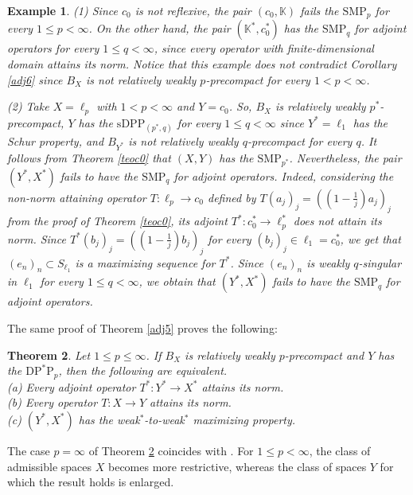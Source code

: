\documentclass[12 pt]{article}%
\newtheorem{theorem}{Theorem}[section]
\newtheorem{example}[theorem]{Example}
\newtheorem{final remark}[theorem]{Final Remark}
\newcommand {\K} {\mathbb{K}}
\begin{document}
\begin{example}\label{contraexadj1} \rm 
(1) Since $c_0$ is not reflexive, the pair $(c_0, \K)$ fails the $\mathrm{SMP}_p$ for every $1\leq p<\infty$. On the other hand, the pair $(\K^*, c_0^*)$ has the $\mathrm{SMP}_q$ for adjoint operators for every $1\leq q<\infty$,
since every operator with finite-dimensional domain attains its norm. Notice that this example does not contradict Corollary \ref{adj6} since $B_X$ is not relatively weakly $p$-precompact for every $1 < p < \infty$. 

(2) Take $X = \ell_p$ with $1 < p < \infty$ and $Y = c_0$. So, $B_{X}$ is relatively weakly $p^*$-precompact, $Y$ has the $\mathrm{sDPP}_{(p^*,q)}$ for every $1 \leq q < \infty$ since $Y^* = \ell_1$ has the Schur property, and $B_{Y^*}$ is not relatively weakly $q$-precompact for every $q$.  It follows from Theorem \ref{teoc0} that  $(X, Y)$ has the $\mathrm{SMP}_{p^*}$. Nevertheless, the pair $(Y^*, X^*)$ fails to have the $\mathrm{SMP}_q$ for adjoint operators. Indeed, considering the non-norm attaining operator  $T: \ell_{p}\to c_{0}$ defined by $\displaystyle T(a_j)_j=((1-\frac{1}{j})a_{j})_j $ from the proof of Theorem \ref{teoc0}, its adjoint $T^*: c_0^* \to \ell_p^*$ does not attain its norm. Since 
$ T^*(b_j)_j = ((1- \frac{1}{j})b_j)_j $
for every $(b_j)_j \in \ell_1 = c_0^*$, we get that $(e_n)_n \subset S_{\ell_1}$ is a maximizing sequence for $T^*$. Since $(e_n)_n$ is weakly $q$-singular in $\ell_1$ for every $1 \leq  q < \infty$, we obtain that $(Y^*, X^*)$ fails to have the $\mathrm{SMP}_q$ for adjoint operators.
\end{example}




The same proof of Theorem \ref{adj5} proves the following:


\begin{theorem} \label{adj7}
    Let $1 \leq p \leq \infty$. If $B_X$ is relatively weakly $p$-precompact and $Y$ has the $\mathrm{DP}^*\mathrm{P}_p$, then the following are equivalent. \\
    {\rm (a)} Every adjoint operator $T^{*}:Y^{*} \to X^{*}$ attains its norm.\\
       {\rm (b)} Every operator $T:X \to Y$ attains its norm.\\
        {\rm (c)} $(Y^{*},X^{*})$ has the weak$^*$-to-weak$^*$ maximizing property.
\end{theorem}

The case $p = \infty$ of Theorem \ref{adj7} coincides with \cite[Proposition 5.10]{garcia-lirola}. For $1 \leq p < \infty$, the class of admissible spaces $X$ becomes more restrictive, whereas the class of spaces $Y$ for which the result holds is enlarged. 
\end{document}
